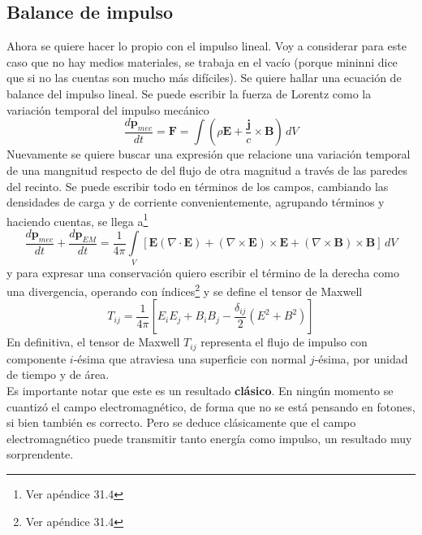 
\subsection{Balance de impulso}
Ahora se quiere hacer lo propio con el impulso lineal. Voy a considerar para este caso que no hay medios materiales, se trabaja en el vacío (porque mininni dice que si no las cuentas son mucho más difíciles). Se quiere hallar una ecuación de balance del impulso lineal. Se puede escribir la fuerza de Lorentz como la variación temporal del impulso mecánico
\begin{equation*}
    \frac{d\textbf{p}_{mec}}{dt} = \textbf{F}
    = \int 
    \left(
        \rho \textbf{E} + \frac{\textbf{j}}{c}\times \textbf{B}
    \right)\,dV
\end{equation*}
Nuevamente se quiere buscar una expresión que relacione una variación temporal de una mangnitud respecto de del flujo de otra magnitud a través de las paredes del recinto. Se puede escribir todo en términos de los campos, cambiando las densidades de carga y de corriente convenientemente, agrupando términos y haciendo cuentas, se llega a\footnote{Ver apéndice 31.4} 
\begin{equation*}
    \frac{d\textbf{p}_{mec}}{dt} + \frac{d\textbf{p}_{EM}}{dt} =
    \frac{1}{4\pi}
    \int\limits_{V}
    \left[
        \textbf{E}
        \left(
            \nabla \cdot \textbf{E}
        \right)
        +
        \left(
            \nabla \times \textbf{E}
        \right) \times \textbf{E}
        +
        \left(
            \nabla \times \textbf{B}
        \right) \times \textbf{B}
    \right]\,dV
\end{equation*}
y para expresar una conservación quiero escribir el término de la derecha como una divergencia, operando con índices\footnote{Ver apéndice 31.4} y se define el tensor de Maxwell
\begin{equation}
    T_{ij} = \frac{1}{4\pi}
    \left[
        E_{i}E_{j}
        +
        B_{i}B_{j}
        -
        \frac{\delta_{ij}}{2}
        \left(
            E^{2} + B^{2}
        \right)
    \right]
        \label{ec:TensorMaxwell}
\end{equation}
En definitiva, el tensor de Maxwell $T_{ij}$ representa el flujo de impulso con componente $i$-ésima que atraviesa una superficie con normal $j$-ésima, por unidad de tiempo y de área.\\
\indent Es importante notar que este es un resultado \textbf{clásico}. En ningún momento se cuantizó el campo electromagnético, de forma que no se está pensando en fotones, si bien también es correcto. Pero se deduce clásicamente que el campo electromagnético puede transmitir tanto energía como impulso, un resultado muy sorprendente.\\
